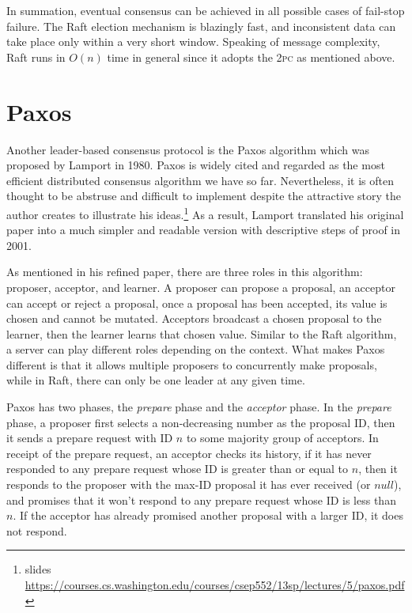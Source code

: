 \documentclass[11pt]{article}
\begin{document}
    In summation, eventual consensus can be achieved in all possible cases of fail-stop failure. The Raft election mechanism is blazingly fast, and inconsistent data can take place only within a very short window. Speaking of message complexity, Raft runs in $O(n)$ time in general since it adopts the \textsc{2pc} as mentioned above.

  \section{Paxos}
    Another leader-based consensus protocol is the Paxos algorithm which was proposed by Lamport in 1980\autocite{paxos}. Paxos is widely cited and regarded as the most efficient distributed consensus algorithm we have so far. Nevertheless, it is often thought to be abstruse and difficult to implement despite the attractive story the author creates to illustrate his ideas.\footnote{\label{}slides \url{https://courses.cs.washington.edu/courses/csep552/13sp/lectures/5/paxos.pdf}} As a result, Lamport translated his original paper into a much simpler and readable version with descriptive steps of proof in 2001.\autocite{paxos2001}

    As mentioned in his refined paper, there are three roles in this algorithm: proposer, acceptor, and learner. A proposer can propose a proposal, an acceptor can accept or reject a proposal, once a proposal has been accepted, its value is chosen and cannot be mutated. Acceptors broadcast a chosen proposal to the learner, then the learner learns that chosen value. Similar to the Raft algorithm, a server can play different roles depending on the context. What makes Paxos different is that it allows multiple proposers to concurrently make proposals, while in Raft, there can only be one leader at any given time.

    Paxos has two phases, the \textit{prepare} phase and the \textit{acceptor} phase. In the \textit{prepare} phase, a proposer first selects a non-decreasing number as the proposal {\footnotesize ID}, then it sends a prepare request with {\footnotesize ID} $n$ to some majority group of acceptors. In receipt of the prepare request, an acceptor checks its history, if it has never responded to any prepare request whose {\footnotesize ID} is greater than or equal to $n$, then it responds to the proposer with the max-{\footnotesize ID} proposal it has ever received (or $null$), and promises that it won't respond to any prepare request whose {\footnotesize ID} is less than $n$. If the acceptor has already promised another proposal with a larger {\footnotesize ID}, it does not respond.
\end{document}
